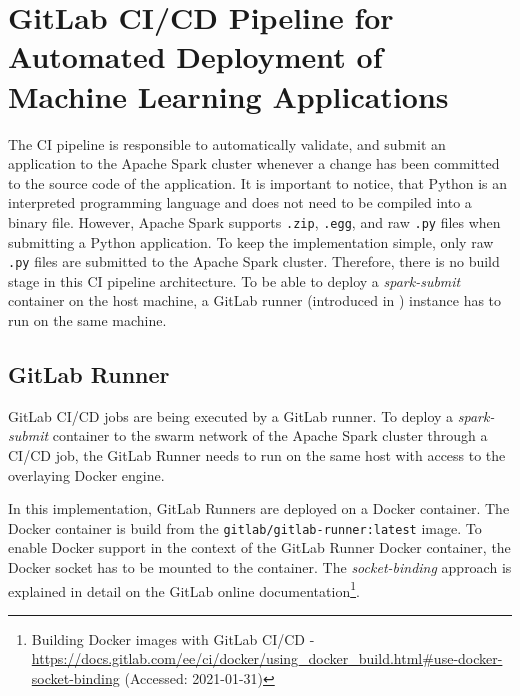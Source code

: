 \section{GitLab CI/CD Pipeline for Automated Deployment of Machine Learning Applications}
\label{sec:06_pipeline}
%
The CI pipeline is responsible to automatically validate, and submit an application to the Apache Spark cluster whenever a change has been committed to the source code of the application.
It is important to notice, that Python is an interpreted programming language and does not need to be compiled into a binary file. However, Apache Spark supports \texttt{.zip}, \texttt{.egg}, and raw \texttt{.py} files when submitting a Python application. To keep the implementation simple, only raw \texttt{.py} files are submitted to the Apache Spark cluster. Therefore, there is no build stage in this CI pipeline architecture.
%
To be able to deploy a \textit{spark-submit} container on the host machine, a GitLab runner (introduced in ) instance has to run on the same machine.


\subsection{GitLab Runner}
\label{subsec:06_pipeline_runner}
GitLab CI/CD jobs are being executed by a GitLab runner.
To deploy a \textit{spark-submit} container to the swarm network of the Apache Spark cluster through a CI/CD job, the GitLab Runner needs to run on the same host with access to the overlaying Docker engine.


In this implementation, GitLab Runners are deployed on a Docker container.
The Docker container is build from the \texttt{gitlab/gitlab-runner:latest} image.
To enable Docker support in the context of the GitLab Runner Docker container, the Docker socket has to be mounted to the container. The \textit{socket-binding} approach is explained in detail on the GitLab online documentation\footnote{Building Docker images with GitLab CI/CD  - \url{https://docs.gitlab.com/ee/ci/docker/using_docker_build.html\#use-docker-socket-binding} (Accessed: 2021-01-31)}.


